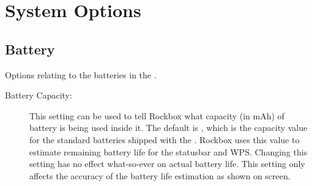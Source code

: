 \section{\label{ref:SystemOptions}System Options}

\subsection{Battery}
    Options relating to the batteries in the \dap.
  \begin{description}
    \item [Battery Capacity: ]This setting can be used to tell Rockbox what
      capacity (in mAh) of battery is being used inside it. The default is
      , which is the capacity value for the standard batteries shipped with the
      \dap. Rockbox uses this value to estimate remaining battery life for the 
      statusbar and WPS. Changing this setting has no effect what-so-ever on 
      actual battery life. This setting only affects the accuracy of the 
      battery life estimation as shown on screen.
   
    
  \end{description}

